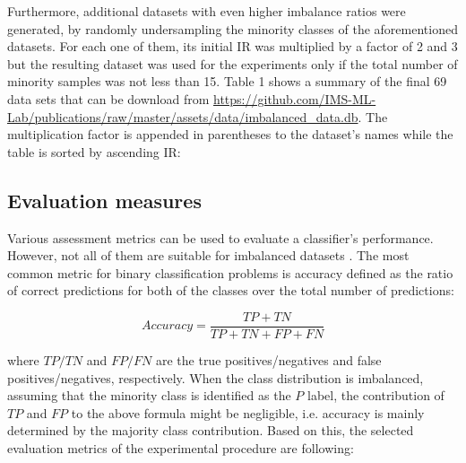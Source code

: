 \documentclass[parskip=full]{scrartcl}
\begin{document}
 Furthermore, additional datasets with even higher imbalance ratios were
 generated, by randomly undersampling the minority classes of the aforementioned
 datasets. For each one of them, its initial IR was multiplied by a factor of 2
 and 3 but the resulting dataset was used for the experiments only if the total
 number of minority samples was not less than 15. Table 1 shows a summary of the
 final 69 data sets that can be download from 
 \url{https://github.com/IMS-ML-Lab/publications/raw/master/assets/data/imbalanced_data.db}.
 The multiplication factor is appended in parentheses to the dataset's names
 while the table is sorted by ascending IR:


\subsection{Evaluation measures}

Various assessment metrics can be used to evaluate a classifier's performance.
However, not all of them are suitable for imbalanced datasets \cite{He2009}. The
most common metric for binary classification problems is accuracy defined as the
ratio of correct predictions for both of the classes over the total number of
predictions:

$$Accuracy = \frac{TP + TN}{TP +TN + FP + FN}$$

where \(TP / TN\) and \(FP / FN\) are the true positives/negatives and false
positives/negatives, respectively. When the class distribution is imbalanced,
assuming that the minority class is identified as the \(P\) label, the
contribution of \(TP\) and \(FP\) to the above formula might be negligible, i.e.
accuracy is mainly determined by the majority class contribution. Based on this,
the selected evaluation metrics of the experimental procedure are following:
\end{document}
